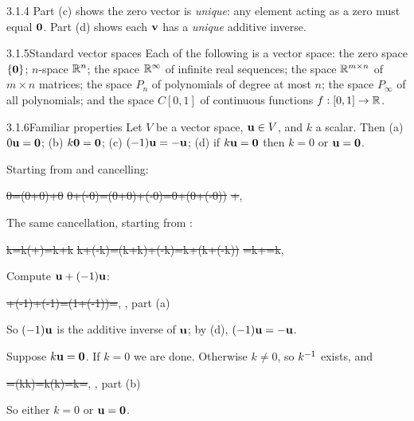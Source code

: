 \begin{rmks}{3.1.4}
Part (c) shows the zero vector is \emph{unique}: any element acting as a zero must equal $\mathbf{0}$. Part (d) shows each $\mathbf{v}$ has a \emph{unique} additive inverse.
\end{rmks}

\begin{exmp}{3.1.5}{Standard vector spaces}
Each of the following is a vector space: the zero space $\{\mathbf{0}\}$; $n$-space $\mathbb{R}^n$; the space $\mathbb{R}^\infty$ of infinite real sequences; the space $\mathbb{R}^{m\times n}$ of $m\times n$ matrices; the space $P_n$ of polynomials of degree at most $n$; the space $P_\infty$ of all polynomials; and the space $C[0,1]$ of continuous functions $f:[0,1]\to\mathbb{R}$.
\end{exmp}

\begin{thms}{3.1.6}{Familiar properties}
Let $V$ be a vector space, $\mathbf{u}\in V$, and $k$ a scalar. Then
\textup{(a)} $0\mathbf{u}=\mathbf{0}$; \textup{(b)} $k\mathbf{0}=\mathbf{0}$; \textup{(c)} $(-1)\mathbf{u}=-\mathbf{u}$; \textup{(d)} if $k\mathbf{u}=\mathbf{0}$ then $k=0$ or $\mathbf{u}=\mathbf{0}$.
\end{thms}

\begin{prf}
 Starting from  and cancelling:
\begin{steps}
\st{0\vu=(0+0)\vu+0\vu}{}
\st{0\vu+(-0\vu)=(0\vu+0\vu)+(-0\vu)=0\vu+\bigl(0\vu+(-0\vu)\bigr)}{}
\st{\vu+\vu}{, }
\end{steps}

 The same cancellation, starting from :
\begin{steps}
\st{k\vze=k(\vze+\vze)=k\vze+k\vze}{}
\st{k\vze+(-k\vze)=(k\vze+k\vze)+(-k\vze)=k\vze+\bigl(k\vze+(-k\vze)\bigr)}{}
\st{\vze=k\vze+\vze=k\vze}{, }
\end{steps}

 Compute $\mathbf{u}+(-1)\mathbf{u}$:
\begin{steps}
\st{\vu+(-1)\vu+(-1)\vu=(1+(-1))\vu=\vze}{, , part (a)}
\end{steps}
So $(-1)\mathbf{u}$ is the additive inverse of $\mathbf{u}$; by (d), $(-1)\mathbf{u}=-\mathbf{u}$.

 Suppose $k\mathbf{u}=\mathbf{0}$. If $k=0$ we are done. Otherwise $k\neq0$, so $k^{-1}$ exists, and
\begin{steps}
\st{\vu=(k\inv k)\vu=k\inv(k\vu)=k\inv\vze=\vze}{, , part (b)}
\end{steps}
So either $k=0$ or $\mathbf{u}=\mathbf{0}$.
\end{prf}

